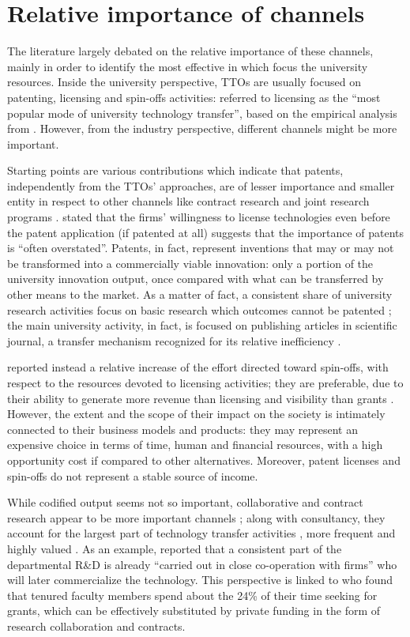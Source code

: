 \section{Relative importance of channels}

The literature largely debated on the relative importance of these channels, mainly in order to identify the most effective in which focus the university resources. Inside the university perspective, TTOs are usually focused on patenting, licensing and spin-offs activities: \citet{Chapple2005} referred to licensing as the \enquote{most popular mode of university technology transfer}, based on the empirical analysis from \citet{Siegel2003}. However, from the industry perspective, different channels might be more important.

Starting points are various contributions which indicate that patents, independently from the TTOs' approaches, are of lesser importance and smaller entity in respect to other channels like contract research and joint research programs \citep{DEste2007}. \citet{Link2005} stated that the firms' willingness to license technologies even before the patent application (if patented at all) suggests that the importance of patents is \enquote{often overstated}. Patents, in fact, represent inventions that may or may not be transformed into a commercially viable innovation: only a portion of the university innovation output, once compared with what can be transferred by other means to the market. As a matter of fact, a consistent share of university research activities focus on basic research which outcomes cannot be patented \citep{Fritsch2007}; the main university activity, in fact, is focused on publishing articles in scientific journal, a transfer mechanism recognized for its relative inefficiency \citet{Rogers2001}. 

\citet{Balderi2007} reported instead a relative increase of the effort directed toward spin-offs, with respect to the resources devoted to licensing activities; they are preferable, due to their ability to generate more revenue than licensing and visibility than grants \citep{Rasmussen2006}. However, the extent and the scope of their impact on the society is intimately connected to their business models and products: they may represent an expensive choice in terms of time, human and financial resources, with a high opportunity cost if compared to other alternatives. Moreover, patent licenses and spin-offs do not represent a stable source of income. 

While codified output seems not so important, collaborative and contract research appear to be more important channels \citep{Bekkers2008}; along with consultancy, they account for the largest part of technology transfer activities \citep{Muscio2010}, more frequent and highly valued \citep{DEste2011}. As an example, \citet{Rasmussen2006} reported that a consistent part of the departmental R\&D is already \enquote{carried out in close co-operation with firms} who will later commercialize the technology. This perspective is linked to \citet{Link2007} who found that tenured faculty members spend about the 24\% of their time seeking for grants, which can be effectively substituted by private funding in the form of research collaboration and contracts. 

